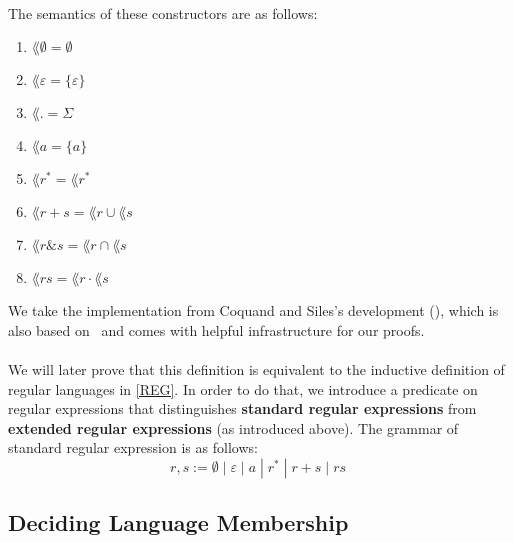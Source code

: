     \paragraph{} 
    The semantics of these constructors are as follows:
    \begin{enumerate}
        \item $\lang{\emptyset} = \emptyset$
        \item $\lang{\varepsilon} = \{\varepsilon\}$
        \item $\lang{.} = \Sigma$
        \item $\lang{a} = \{a\}$
        \item $\lang{r^*} = \lang{r}^*$
        \item $\lang{r + s} = \lang{r} \cup \lang{s}$
        \item $\lang{r \& s} = \lang{r} \cap \lang{s}$
        \item $\lang{r s} = \lang{r} \cdot \lang{s}$
    \end{enumerate}

    We take the implementation from Coquand and Siles's development (\cite{DBLP:conf/cpp/CoquandS11}), which is also based on \ssreflect\ and comes with helpful infrastructure for our proofs.


    \paragraph{}
    We will later prove that this definition is equivalent to the inductive definition of regular languages in \ref{REG}.
    In order to do that, we introduce a predicate on regular expressions that distinguishes \textbf{standard regular expressions} 
    from \textbf{extended regular expressions} (as introduced above).
    The grammar of standard regular expression is as follows:
    \begin{equation*}
        r,s := \emptyset \; | \; \varepsilon \; | \; a \; | \; r^* \; | \; r + s \; | \; r s \; 
    \end{equation*}





    \subsection{Deciding Language Membership}
